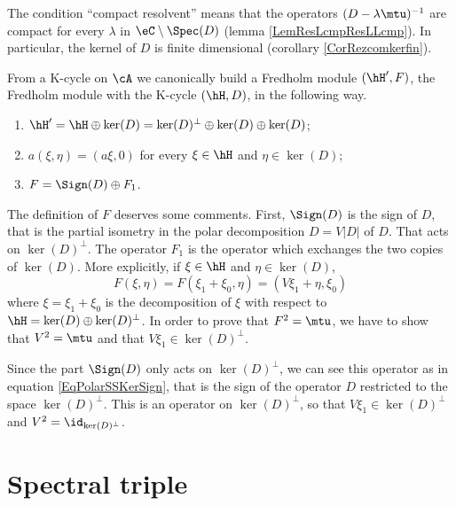 \begin{remark}
	The condition ``compact resolvent'' means that the operators $(D-\lambda\mtu)^{-1}$ are compact for every $\lambda$ in $\eC\setminus\Spec(D)$ (lemma \ref{LemResLcmpResLLcmp}). In particular, the kernel of $D$ is finite dimensional (corollary \ref{CorRezcomkerfin}).
\end{remark}

From a K-cycle on $\cA$ we canonically build a Fredholm module $(\hH',F)$, the Fredholm module  with the K-cycle $(\hH,D)$, in the following way.
\begin{enumerate}
	\item
		$\hH'=\hH\oplus\ker(D)=\ker(D)^{\perp}\oplus\ker(D)\oplus\ker(D)$;
	\item
		$a(\xi,\eta)=(a\xi,0)$ for every $\xi\in\hH$ and $\eta\in\ker(D)$;
	\item
		$F=\Sign(D)\oplus F_1$.
\end{enumerate}
The definition of $F$ deserves some comments. First, $\Sign(D)$ is the sign of $D$, that is the partial isometry in the polar decomposition $D=V| D |$ of $D$. That acts on $\ker(D)^{\perp}$. The operator $F_1$ is the operator which exchanges the two copies of $\ker(D)$. More explicitly, if $\xi\in\hH$ and $\eta\in\ker(D)$,
\begin{equation}
	F(\xi,\eta)=F(\xi_1+\xi_0,\eta)=(V\xi_1+\eta,\xi_0)
\end{equation}
where $\xi=\xi_1+\xi_0$ is the decomposition of $\xi$ with respect to $\hH=\ker(D)\oplus\ker(D)^{\perp}$. In order to prove that $F^2=\mtu$, we have to show that $V^2=\mtu$ and that $V\xi_1\in\ker(D)^{\perp}$.

Since the part $\Sign(D)$ only acts on $\ker(D)^{\perp}$, we can see this operator as in equation \eqref{EqPolarSSKerSign}, that is the sign of the operator $D$ restricted to the space $\ker(D)^{\perp}$. This is an operator on $\ker(D)^{\perp}$, so that $V\xi_1\in\ker(D)^{\perp}$ and $V^2=\id_{\ker(D)^{\perp}}$.

\section{Spectral triple}

